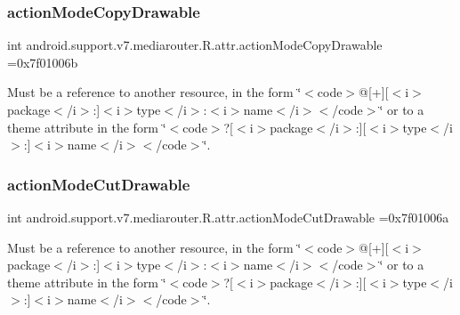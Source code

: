\subsubsection{\texorpdfstring{action\+Mode\+Copy\+Drawable}{actionModeCopyDrawable}}
{\footnotesize\ttfamily int android.\+support.\+v7.\+mediarouter.\+R.\+attr.\+action\+Mode\+Copy\+Drawable =0x7f01006b\hspace{0.3cm}{\ttfamily [static]}}

Must be a reference to another resource, in the form \char`\"{}$<$code$>$@\mbox{[}+\mbox{]}\mbox{[}$<$i$>$package$<$/i$>$\+:\mbox{]}$<$i$>$type$<$/i$>$\+:$<$i$>$name$<$/i$>$$<$/code$>$\char`\"{} or to a theme attribute in the form \char`\"{}$<$code$>$?\mbox{[}$<$i$>$package$<$/i$>$\+:\mbox{]}\mbox{[}$<$i$>$type$<$/i$>$\+:\mbox{]}$<$i$>$name$<$/i$>$$<$/code$>$\char`\"{}. \mbox{\label{classandroid_1_1support_1_1v7_1_1mediarouter_1_1R_1_1attr_a6fb4fd45ab39f21302d7519c4f8d3aa1}} 
\subsubsection{\texorpdfstring{action\+Mode\+Cut\+Drawable}{actionModeCutDrawable}}
{\footnotesize\ttfamily int android.\+support.\+v7.\+mediarouter.\+R.\+attr.\+action\+Mode\+Cut\+Drawable =0x7f01006a\hspace{0.3cm}{\ttfamily [static]}}

Must be a reference to another resource, in the form \char`\"{}$<$code$>$@\mbox{[}+\mbox{]}\mbox{[}$<$i$>$package$<$/i$>$\+:\mbox{]}$<$i$>$type$<$/i$>$\+:$<$i$>$name$<$/i$>$$<$/code$>$\char`\"{} or to a theme attribute in the form \char`\"{}$<$code$>$?\mbox{[}$<$i$>$package$<$/i$>$\+:\mbox{]}\mbox{[}$<$i$>$type$<$/i$>$\+:\mbox{]}$<$i$>$name$<$/i$>$$<$/code$>$\char`\"{}. \mbox{\label{classandroid_1_1support_1_1v7_1_1mediarouter_1_1R_1_1attr_a24c23910e12c30a8b0baf645cf3b21e5}} 
